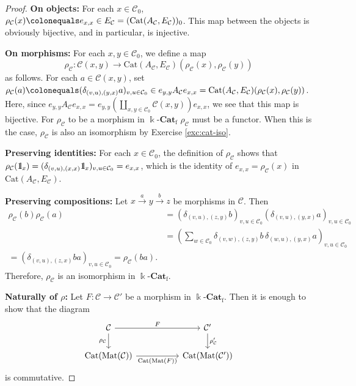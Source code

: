 \documentclass{surv-l}
\numberwithin{equation}{chapter}
\numberwithin{figure}{chapter}
\theoremstyle{plain}
\theoremstyle{definition}
\theoremstyle{remark}
\newcommand{\id}{1\kern-.25em{\text{{\rm l}}}}
\newcommand{\kCat}{\Bbbk\text{-}\mathbf{Cat}}
\newcommand{\Ar}[3]{\ar[from={#1}, to={#2}, #3]}
\DeclareMathOperator{\Mat}{Mat}
\begin{document}
\begin{proof}
{\bf On objects:}
For each $x \in {\mathcal{C}}_0$,
$\rho_{\mathcal{C}}(x)\colonequals  e_{x,x} \in E_{\mathcal{C}} = (\mathrm{Cat}(A_{\mathcal{C}},E_{\mathcal{C}}))_0$.
This map between the objects is obviously bijective, and in particular, is injective.

{\bf On morphisms:}
For each $x,y \in {\mathcal{C}}_0$, we define a map
\[
\rho_{\mathcal{C}} \colon {\mathcal{C}}(x,y) \to \mathrm{Cat}(A_{\mathcal{C}},E_{\mathcal{C}})(\rho_{\mathcal{C}}(x),\rho_{\mathcal{C}}(y))
\]
as follows.
For each $a \in {\mathcal{C}}(x,y)$, set
$\rho_{\mathcal{C}}(a)\colonequals  (\delta_{(v,u),(y,x)}a)_{v,u\in {\mathcal{C}}_0} \in e_{y,y}A_{\mathcal{C}} e_{x,x} = \mathrm{Cat}(A_{\mathcal{C}},E_{\mathcal{C}})(\rho_{\mathcal{C}}(x),\rho_{\mathcal{C}}(y))$.
Here, since $e_{y,y}A_{\mathcal{C}} e_{x,x} = e_{y,y}\left(\coprod_{x,y\in {\mathcal{C}}_0}{\mathcal{C}}(x,y)\right) e_{x,x}$,
we see that this map is bijective.
For $\rho_{\mathcal{C}}$ to be a morphism in $\kCat_{\mathrm{f}}$
 $\rho_{\mathcal{C}}$ must be a functor.
When this is the case, $\rho_{\mathcal{C}}$ is also an isomorphism by Exercise \ref{exc:cat-iso}.

{\bf Preserving identities:}
For each $x \in {\mathcal{C}}_0$, the definition of $\rho_{\mathcal{C}}$ shows that
$\rho_{\mathcal{C}}(\id_x) = (\delta_{(v,u),(x,x)} \id_x)_{v,u\in {\mathcal{C}}_0} = e_{x,x}$, which is
the identity of $e_{x,x} = \rho_{\mathcal{C}}(x)$ in $\mathrm{Cat}(A_{\mathcal{C}}, E_{\mathcal{C}})$.

{\bf Preserving compositions:}
Let $x \xrightarrow{a} y \xrightarrow{b} z$ be morphisms in ${\mathcal{C}}$.
Then
\[
\begin{aligned}
\rho_{\mathcal{C}}(b)\rho_{\mathcal{C}}(a) &= (\delta_{(v,u),(z,y)}b)_{v,u\in {\mathcal{C}}_0}
(\delta_{(v,u),(y,x)}a)_{v,u\in {\mathcal{C}}_0}\\
&= \left(\sum_{w\in {\mathcal{C}}_0}\delta_{(v,w),(z,y)}b\, \delta_{(w,u),(y,x)}a\right)_{v,u\in {\mathcal{C}}_0}\\
= (\delta_{(v,u),(z,x)}ba)_{v,u\in {\mathcal{C}}_0} = \rho_{\mathcal{C}}(ba).
\end{aligned}
\]
Therefore, $\rho_{\mathcal{C}}$ is an isomorphism in $\kCat_{\mathrm{f}}$.

{\bf Naturally of $\rho$:}
Let $F \colon {\mathcal{C}} \to {\mathcal{C}}'$ be a morphism in $\kCat_{\mathrm{f}}$.
Then it is enough to show that the diagram
\[
\begin{tikzcd}[column sep=50]
{\mathcal{C}} & {\mathcal{C}}'\\
\mathrm{Cat}(\Mat({\mathcal{C}})) & \mathrm{Cat}(\Mat({\mathcal{C}}'))
\Ar{1-1}{1-2}{"F"}
\Ar{2-1}{2-2}{"\mathrm{Cat}(\Mat(F))"'}
\Ar{1-1}{2-1}{"\rho_{\mathcal{C}}"'}
\Ar{1-2}{2-2}{"\rho_{\mathcal{C}}'"}
\end{tikzcd}
\]
is commutative.


\end{proof}
\end{document}
